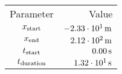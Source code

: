 \begin{tabular}{cr}
    \toprule
    Parameter & Value \\ \otoprule
    $x_{\textup{start}}$    & $\unit[-2.33 \cdot 10^{1}]{m}$ \\
    $x_{\textup{end}}$      & $\unit[2.12 \cdot 10^{2}]{m}$ \\
    $t_{\textup{start}}$    & $\unit[0.00]{s}$ \\
    $t_{\textup{duration}}$ & $\unit[1.32 \cdot 10^{1}]{s}$ \\
    \bottomrule
\end{tabular}
